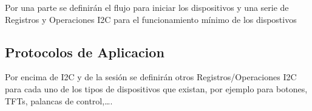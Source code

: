 Por una parte se definirán el flujo para iniciar los dispositivos y una serie de Registros y Operaciones I2C para
el funcionamiento mínimo de los dispostivos

\subsection{Protocolos de Aplicacion}

Por encima de I2C y de la sesión se definirán otros Registros/Operaciones I2C para cada uno de los tipos de
dispositivos que existan,  por ejemplo para botones, TFTs, palancas de control,\dots.
